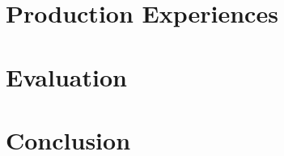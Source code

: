 \documentclass[times, 10pt, twocolumn]{article}
\begin{document}
\section{Production Experiences}





\section{Evaluation}






\section{Conclusion}
\end{document}
